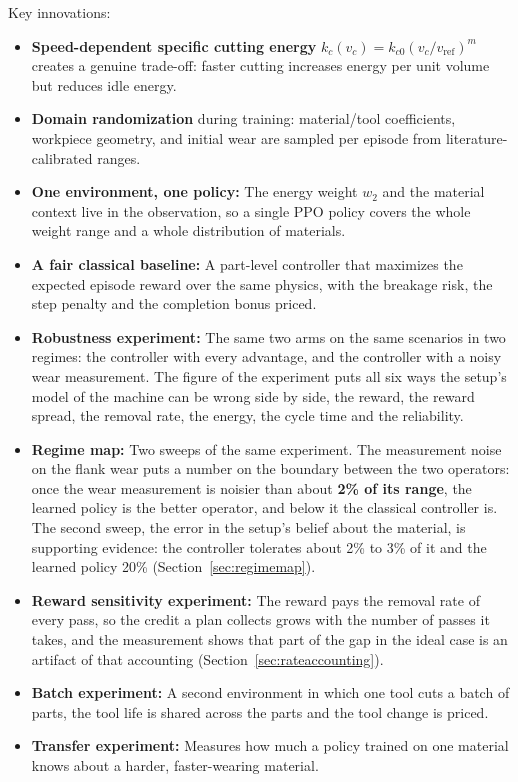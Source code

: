 \documentclass[11pt,a4paper]{article}
\newcommand{\alert}[1]{\textcolor{IITGold}{\textbf{#1}}}
\begin{document}
Key innovations:
\begin{itemize}
    \item \textbf{Speed-dependent specific cutting energy} $k_c(v_c) = k_{c0} (v_c/v_\text{ref})^m$ creates a genuine trade-off: faster cutting increases energy per unit volume but reduces idle energy.
    \item \textbf{Domain randomization} during training: material/tool coefficients, workpiece geometry, and initial wear are sampled per episode from literature-calibrated ranges.
    \item \textbf{One environment, one policy:} The energy weight $w_2$ and the material context live in the observation, so a single PPO policy covers the whole weight range and a whole distribution of materials.
    \item \textbf{A fair classical baseline:} A part-level controller that maximizes the expected episode reward over the same physics, with the breakage risk, the step penalty and the completion bonus priced.
    \item \textbf{Robustness experiment:} The same two arms on the same scenarios in two regimes: the controller with every advantage, and the controller with a noisy wear measurement. The figure of the experiment puts all six ways the setup's model of the machine can be wrong side by side, the reward, the reward spread, the removal rate, the energy, the cycle time and the reliability.
    \item \textbf{Regime map:} Two sweeps of the same experiment. The measurement noise on the flank wear puts a number on the boundary between the two operators: once the wear measurement is noisier than about \alert{2\% of its range}, the learned policy is the better operator, and below it the classical controller is. The second sweep, the error in the setup's belief about the material, is supporting evidence: the controller tolerates about 2\% to 3\% of it and the learned policy 20\% (Section~\ref{sec:regimemap}).
    \item \textbf{Reward sensitivity experiment:} The reward pays the removal rate of every pass, so the credit a plan collects grows with the number of passes it takes, and the measurement shows that part of the gap in the ideal case is an artifact of that accounting (Section~\ref{sec:rateaccounting}).
    \item \textbf{Batch experiment:} A second environment in which one tool cuts a batch of parts, the tool life is shared across the parts and the tool change is priced.
    \item \textbf{Transfer experiment:} Measures how much a policy trained on one material knows about a harder, faster-wearing material.
\end{itemize}
\end{document}
